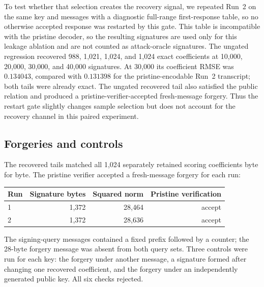 \documentclass[11pt,a4paper]{article}
\begin{document}
To test whether that selection creates the recovery signal, we repeated Run~2
on the same key and messages with a diagnostic full-range first-response
table, so no otherwise accepted response was restarted by this gate.  This
table is incompatible with the pristine decoder, so the resulting signatures
are used only for this leakage ablation and are not counted as attack-oracle
signatures.  The ungated regression recovered 988, 1,021, 1,024, and 1,024
exact coefficients at 10,000, 20,000, 30,000, and 40,000 signatures.  At
30,000 its coefficient RMSE was $0.134043$, compared with $0.131398$ for the
pristine-encodable Run~2 transcript; both tails were already exact.  The
ungated recovered tail also satisfied the public relation and produced a
pristine-verifier-accepted fresh-message forgery.  Thus the restart gate
slightly changes sample selection but does not account for the recovery
channel in this paired experiment.

\subsection{Forgeries and controls}

The recovered tails matched all 1,024 separately retained scoring
coefficients byte for byte.  The pristine verifier accepted a fresh-message
forgery for each run:
\begin{center}
\begin{tabular}{@{}lrrr@{}}
\toprule
Run & Signature bytes & Squared norm & Pristine verification\\
\midrule
1 & 1,372 & 28,464 & accept\\
2 & 1,372 & 28,636 & accept\\
\bottomrule
\end{tabular}
\end{center}
The signing-query messages contained a fixed prefix followed by a counter;
the 28-byte forgery message was absent from both query sets.  Three controls
were run for each key: the forgery under another message, a signature formed
after changing one recovered coefficient, and the forgery under an
independently generated public key.  All six checks rejected.
\end{document}
